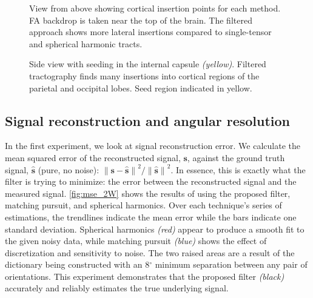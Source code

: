\documentclass[final,hyperref]{gatech-thesis}
\renewcommand{\deg}{\ensuremath{^\circ}\xspace}
\renewcommand{\v}[1]{\ensuremath{\mathbf #1}\xspace}
\newcommand{\s}{\v s}
\newcommand{\norm}[1]{\ensuremath{\|#1\|}}
\begin{document}
\begin{figure}[t]
  \centering
  \caption{View from above showing cortical insertion points for each method.
    FA backdrop is taken near the top of the brain.  The filtered approach
    shows more lateral insertions compared to single-tensor and spherical
    harmonic tracts.}
  \label{fig:ic_top}
\end{figure}
\begin{figure}[t]
  \centering

  \caption{Side view with seeding in the internal capsule \textit{(yellow)}.
    Filtered tractography finds many insertions into cortical regions of the
    parietal and occipital lobes.  Seed region indicated in yellow.}
  \label{fig:ic_side}
\end{figure}


\subsection{Signal reconstruction and angular resolution}  \label{sec:mse_angle}

In the first experiment, we look at signal reconstruction error.  We calculate
the mean squared error of the reconstructed signal, \s, against the ground
truth signal, $\hat{\s}$ (pure, no noise): $ \norm{\s - \hat{\s}}^2 /
\norm{\hat{\s}}^2$.  In essence, this is exactly what the filter is trying to
minimize: the error between the reconstructed signal and the measured signal.
\autoref{fig:mse_2W} shows the results of using the proposed filter, matching
pursuit, and spherical harmonics.  Over each technique's series of
estimations, the trendlines indicate the mean error while the bars indicate
one standard deviation.  Spherical harmonics \textit{(red)} appear to produce
a smooth fit to the given noisy data, while matching pursuit \textit{(blue)}
shows the effect of discretization and sensitivity to noise.  The two raised
areas are a result of the dictionary being constructed with an 8\deg minimum
separation between any pair of orientations.  This experiment demonstrates
that the proposed filter \textit{(black)} accurately and reliably estimates
the true underlying signal.
\end{document}
